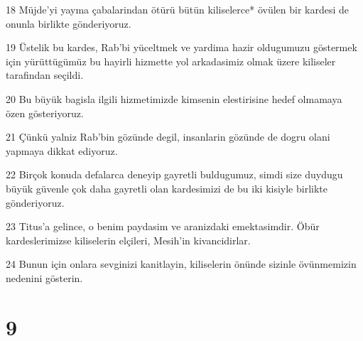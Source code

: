 \par 18 Müjde'yi yayma çabalarindan ötürü bütün kiliselerce* övülen bir kardesi de onunla birlikte gönderiyoruz.
\par 19 Üstelik bu kardes, Rab'bi yüceltmek ve yardima hazir oldugumuzu göstermek için yürüttügümüz bu hayirli hizmette yol arkadasimiz olmak üzere kiliseler tarafindan seçildi.
\par 20 Bu büyük bagisla ilgili hizmetimizde kimsenin elestirisine hedef olmamaya özen gösteriyoruz.
\par 21 Çünkü yalniz Rab'bin gözünde degil, insanlarin gözünde de dogru olani yapmaya dikkat ediyoruz.
\par 22 Birçok konuda defalarca deneyip gayretli buldugumuz, simdi size duydugu büyük güvenle çok daha gayretli olan kardesimizi de bu iki kisiyle birlikte gönderiyoruz.
\par 23 Titus'a gelince, o benim paydasim ve aranizdaki emektasimdir. Öbür kardeslerimizse kiliselerin elçileri, Mesih'in kivancidirlar.
\par 24 Bunun için onlara sevginizi kanitlayin, kiliselerin önünde sizinle övünmemizin nedenini gösterin.

\chapter{9}

